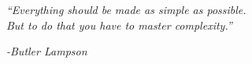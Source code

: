 \clearpage
{}

\begin{center}
\vspace*{11cm}
\textit{``Everything should be made as simple as possible. \\ But to do that you have to master complexity.''}
\end{center}
\par
\hspace*{7cm}
\textit{-Butler Lampson}
